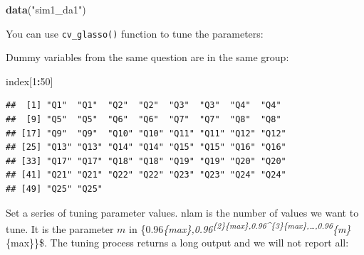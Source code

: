 \documentclass[12pt,]{krantz}
\makeatletter
\newenvironment{Shaded}{\begin{snugshade}}{\end{snugshade}}
\newcommand{\CharTok}[1]{\textcolor[rgb]{0.5,0.5,0.5}{#1}}
\newcommand{\CommentTok}[1]{\textcolor[rgb]{0.37,0.37,0.37}{\textit{#1}}}
\newcommand{\DecValTok}[1]{\textcolor[rgb]{0.06,0.06,0.06}{#1}}
\newcommand{\KeywordTok}[1]{\textcolor[rgb]{0.27,0.27,0.27}{\textbf{#1}}}
\newcommand{\NormalTok}[1]{#1}
\newcommand{\OperatorTok}[1]{\textcolor[rgb]{0.43,0.43,0.43}{\textbf{#1}}}
\newcommand{\StringTok}[1]{\textcolor[rgb]{0.5,0.5,0.5}{#1}}
\newenvironment{kframe}{%
\medskip{}
\setlength{\fboxsep}{.8em}
 \def\at@end@of@kframe{}%
 \ifinner\ifhmode%
  \def\at@end@of@kframe{\end{minipage}}%
  \begin{minipage}{\columnwidth}%
 \fi\fi%
 \def\FrameCommand##1{\hskip\@totalleftmargin \hskip-\fboxsep
 \colorbox{shadecolor}{##1}\hskip-\fboxsep
     \hskip-\linewidth \hskip-\@totalleftmargin \hskip\columnwidth}%
 \MakeFramed {\advance\hsize-\width
   \@totalleftmargin\z@ \linewidth\hsize
   \@setminipage}}%
 {\par\unskip\endMakeFramed%
 \at@end@of@kframe}
\renewenvironment{Shaded}{\begin{kframe}}{\end{kframe}}
\makeatother
\begin{document}
\begin{Shaded}
\begin{Highlighting}[]
\KeywordTok{data}\NormalTok{(}\StringTok{"sim1_da1"}\NormalTok{)}
\end{Highlighting}
\end{Shaded}

You can use \texttt{cv\_glasso()} function to tune the parameters:

\begin{Shaded}
\end{Shaded}

Dummy variables from the same question are in the same group:

\begin{Shaded}
\begin{Highlighting}[]
\NormalTok{index[}\DecValTok{1}\OperatorTok{:}\DecValTok{50}\NormalTok{]}
\end{Highlighting}
\end{Shaded}

\begin{verbatim}
##  [1] "Q1"  "Q1"  "Q2"  "Q2"  "Q3"  "Q3"  "Q4"  "Q4" 
##  [9] "Q5"  "Q5"  "Q6"  "Q6"  "Q7"  "Q7"  "Q8"  "Q8" 
## [17] "Q9"  "Q9"  "Q10" "Q10" "Q11" "Q11" "Q12" "Q12"
## [25] "Q13" "Q13" "Q14" "Q14" "Q15" "Q15" "Q16" "Q16"
## [33] "Q17" "Q17" "Q18" "Q18" "Q19" "Q19" "Q20" "Q20"
## [41] "Q21" "Q21" "Q22" "Q22" "Q23" "Q23" "Q24" "Q24"
## [49] "Q25" "Q25"
\end{verbatim}

Set a series of tuning parameter values. nlam is the number of values we want to tune. It is the parameter \(m\) in \{0.96\lambda\emph{\{max\},0.96\textsuperscript{\{2\}\lambda\emph{\{max\},0.96\^{}\{3\}\lambda}\{max\},\ldots{},0.96}\{m\}\lambda}\{max\}\}\$. The tuning process returns a long output and we will not report all:
\end{document}
